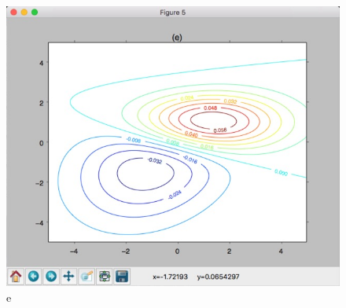\documentclass[11pt]{article}
\begin{document}
\begin{figure}[H]
\begin{center}
\includegraphics[scale=0.5]{3e}
\caption{e}
\end{center}
\end{figure}
\newpage

\end{document}
